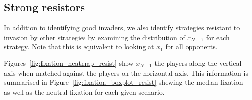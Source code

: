 \documentclass{article}
\begin{document}
\subsection{Strong resistors}\label{sec:strong_resistors}

In addition to identifying good invaders, we also identify strategies
resistant to invasion by other strategies by examining the distribution
of $x_{N-1}$ for each strategy. Note that this is equivalent to
looking at $x_1$ for all opponents.

Figures~\ref{fig:fixation_heatmap_resist} show \(x_{N-1}\)
the players along the vertical axis when matched against the players on the
horizontal axis. This information is summarised in Figure~\ref{fig:fixation_boxplot_resist}
showing the median fixation as well as the neutral fixation for each given
scenario.
\end{document}
